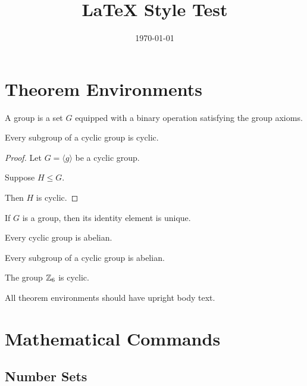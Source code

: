 \documentclass{article}
\title{LaTeX Style Test}
\author{\defaultauthor}
\date{\today}
\begin{document}
\maketitle

\section{Theorem Environments}

\begin{definition}
    A group is a set $G$ equipped with a binary operation
    satisfying the group axioms.
\end{definition}

\begin{theorem}
    Every subgroup of a cyclic group is cyclic.
\end{theorem}

\begin{proof}
    Let $G = \langle g \rangle$ be a cyclic group.

    Suppose $H \leq G$.

    Then $H$ is cyclic.
\end{proof}

\begin{lemma}
    If $G$ is a group, then its identity element is unique.
\end{lemma}

\begin{proposition}
    Every cyclic group is abelian.
\end{proposition}

\begin{corollary}
    Every subgroup of a cyclic group is abelian.
\end{corollary}

\begin{example}
    The group $\mathbb{Z}_6$ is cyclic.
\end{example}

\begin{remark}
    All theorem environments should have upright body text.
\end{remark}


\section{Mathematical Commands}

\subsection{Number Sets}
\end{document}
